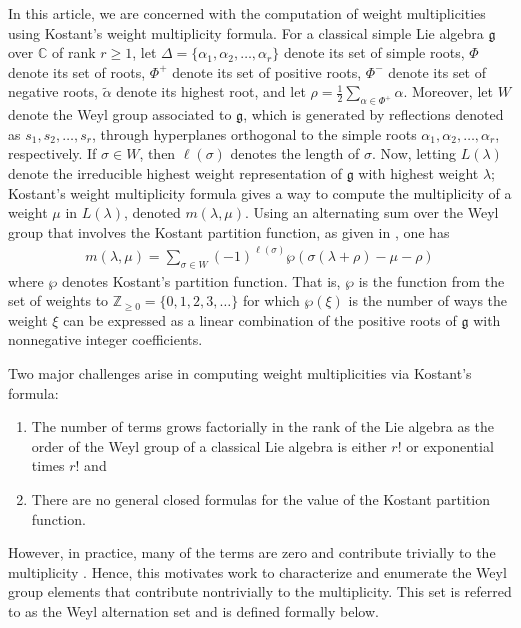 \documentclass{amsart}
\theoremstyle{definition}
\newcommand*{\Z}{\mathbb{Z}}
\begin{document}
 In this article, we are concerned with the computation of weight multiplicities using Kostant's weight multiplicity formula. 
 For a classical simple Lie algebra $\mathfrak{g}$ over $\mathbb{C}$ of rank $r\geq 1$, let $\Delta=\{\alpha_1,\alpha_2,\ldots,\alpha_r\}$ denote its set of simple roots,
    $\Phi$ denote its set of roots,
 $\Phi^+$ denote its set of positive roots, $\Phi^-$ denote its set of negative roots, $\tilde\alpha$
denote its highest root, and let $\rho=\frac{1}{2}\sum_{\alpha\in\Phi^+}\alpha$.
    Moreover, let $W$ denote the Weyl group associated to $\mathfrak{g}$,
    which is generated by reflections denoted as $s_1, s_2,\ldots, s_r$, through hyperplanes orthogonal to the simple roots $\alpha_1,\alpha_2,\ldots,\alpha_r$, respectively. 
If $\sigma\in W$, then $\ell(\sigma)$ denotes the length of $\sigma$.
Now, letting $L(\lambda)$ denote the irreducible highest weight representation of $\mathfrak{g}$ with highest weight $\lambda$; 
Kostant's weight multiplicity formula gives a way to compute the multiplicity of a weight $\mu$ in $L(\lambda)$, denoted $m(\lambda, \mu)$. Using an alternating sum over the Weyl group that involves the Kostant partition function, as given in \cite[Theorem on p.\ 589]{Kostant}, one has
\begin{align}
    m(\lambda, \mu)=\sum_{\sigma \in W} (-1)^{\ell(\sigma)}\wp(\sigma(\lambda+\rho)-\mu - \rho)\label{KWMF}
\end{align}
where 
$\wp$ denotes Kostant's partition function. That is, $\wp$ is the function from the set of weights to $\Z_{\geq0}=\{0,1,2,3,\ldots\}$
for which $\wp(\xi)$ is the number of ways the weight $\xi$ can be expressed as a linear combination of the positive roots of $\mathfrak{g}$ with nonnegative integer coefficients.




Two major challenges arise in computing weight multiplicities via Kostant's formula: 
\begin{enumerate}
    \item[1)] The number of terms grows factorially in the rank of the Lie algebra {as the order of the Weyl group of a classical Lie algebra is either $r!$ or exponential times $r!$} and
    \item[2)] There are no general closed formulas for the value of the Kostant partition function.
\end{enumerate} 
However, in practice, many of the terms are zero and contribute trivially to the multiplicity \cite{Cochet}. 
Hence, this motivates work to characterize and enumerate the Weyl group elements that contribute nontrivially to the multiplicity. This set is referred to as the Weyl alternation set and is defined formally below. 
\end{document}
